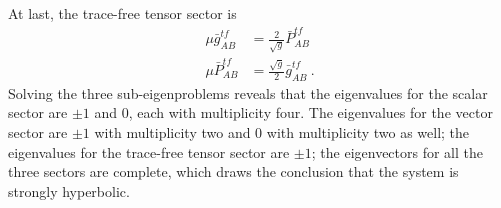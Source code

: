 At last, the trace-free tensor sector is
\begin{subequations}
\begin{align}
\mu {\bar g}^{tf}_{AB} & = \frac{2}{\sqrt{g}}{\bar P}^{tf}_{AB}\\
\mu {\bar P}^{tf}_{AB} & = \frac{\sqrt{g}}{2}{\bar g}^{tf}_{AB} \ .
\end{align}
\end{subequations}
Solving the three sub-eigenproblems reveals that the eigenvalues for the scalar sector are $\pm 1$ and 0, each with multiplicity four. The eigenvalues for the vector sector are $\pm 1$ with multiplicity two and 0 with multiplicity two as well; the eigenvalues for the trace-free tensor sector are $\pm 1$; the eigenvectors for all the three sectors are complete, which draws the conclusion that the system is strongly hyperbolic. 

